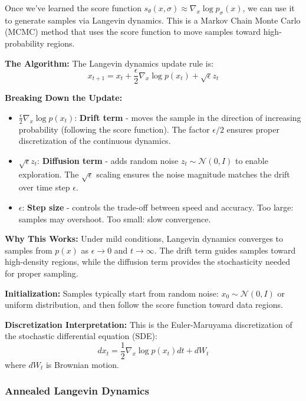 \documentclass[journal]{IEEEtran}
\begin{document}
Once we've learned the score function $s_\theta(x, \sigma) \approx \nabla_x \log p_\sigma(x)$, we can use it to generate samples via Langevin dynamics. This is a Markov Chain Monte Carlo (MCMC) method that uses the score function to move samples toward high-probability regions.

\textbf{The Algorithm:} The Langevin dynamics update rule is:
\begin{equation}
x_{t+1} = x_t + \frac{\epsilon}{2}\nabla_x \log p(x_t) + \sqrt{\epsilon} z_t
\end{equation}

\textbf{Breaking Down the Update:}
\begin{itemize}
    \item $\frac{\epsilon}{2}\nabla_x \log p(x_t)$: \textbf{Drift term} - moves the sample in the direction of increasing probability (following the score function). The factor $\epsilon/2$ ensures proper discretization of the continuous dynamics.
    
    \item $\sqrt{\epsilon} z_t$: \textbf{Diffusion term} - adds random noise $z_t \sim \mathcal{N}(0, I)$ to enable exploration. The $\sqrt{\epsilon}$ scaling ensures the noise magnitude matches the drift over time step $\epsilon$.
    
    \item $\epsilon$: \textbf{Step size} - controls the trade-off between speed and accuracy. Too large: samples may overshoot. Too small: slow convergence.
\end{itemize}

\textbf{Why This Works:} Under mild conditions, Langevin dynamics converges to samples from $p(x)$ as $\epsilon \to 0$ and $t \to \infty$. The drift term guides samples toward high-density regions, while the diffusion term provides the stochasticity needed for proper sampling.

\textbf{Initialization:} Samples typically start from random noise: $x_0 \sim \mathcal{N}(0, I)$ or uniform distribution, and then follow the score function toward data regions.

\textbf{Discretization Interpretation:} This is the Euler-Maruyama discretization of the stochastic differential equation (SDE):
\begin{equation}
dx_t = \frac{1}{2}\nabla_x \log p(x_t) dt + dW_t
\end{equation}
where $dW_t$ is Brownian motion.

\subsubsection{Annealed Langevin Dynamics}
\end{document}
